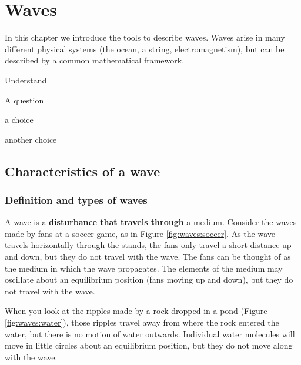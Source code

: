 
\chapter{Waves}
\label{chapter:waves}
In this chapter we introduce the tools to describe waves. Waves arise in many different physical systems (the ocean, a string, electromagnetism), but can be described by a common mathematical framework. 
\begin{learningObjectives}{
 \item Understand 
 }
\end{learningObjectives}

\begin{opening}
\begin{MCquestion}{A question}
\item a choice
\item another choice %
\end{MCquestion}
\end{opening}

\section{Characteristics of a wave}
\subsection{Definition and types of waves}
A wave is a \textbf{disturbance that travels through} a medium. Consider the waves made by fans at a soccer game, as in Figure \ref{fig:waves:soccer}. As the wave travels horizontally through the stands, the fans only travel a short distance up and down, but they do not travel with the wave. The fans can be thought of as the medium in which the wave propagates. The elements of the medium may oscillate about an equilibrium position (fans moving up and down), but they do not travel with the wave. 

When you look at the ripples made by a rock dropped in a pond (Figure \ref{fig:waves:water}), those ripples travel away from where the rock entered the water, but there is no motion of water outwards. Individual water molecules will move in little circles about an equilibrium position, but they do not move along with the wave.

